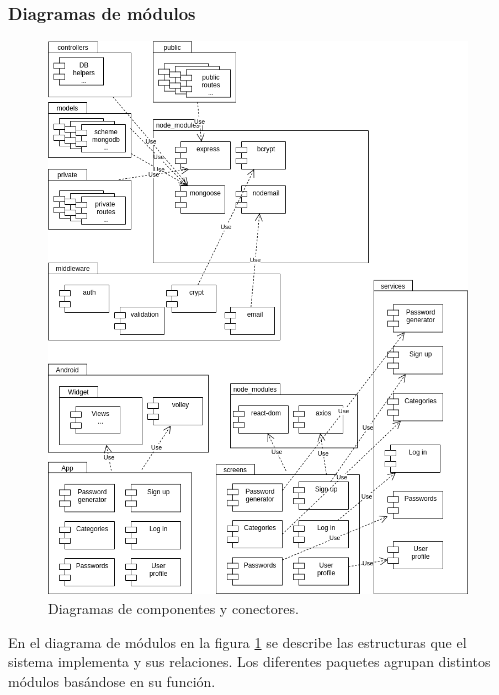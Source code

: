 \documentclass{article}
\begin{document}
\subsubsection*{Diagramas de módulos}
 
\begin{figure}[H]
   \centering
       \includegraphics[width=0.99\textwidth]{../images/modulos_v1.png}
   \caption{Diagramas de componentes y conectores.}
   \label{modulos}
\end{figure}
\pagebreak
 
En el diagrama de módulos en la figura \ref{modulos} se describe las estructuras que el sistema implementa y sus relaciones. Los diferentes paquetes agrupan distintos módulos basándose en su función.
 
\end{document}
